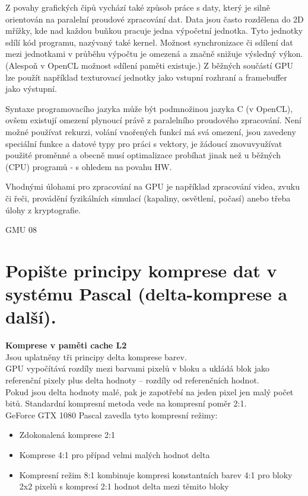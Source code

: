 	Z povahy grafických čipů vychází také způsob práce s daty, který je silně orientován na paralelní proudové zpracování dat. Data jsou často rozdělena do 2D mřížky, kde nad každou buňkou pracuje jedna výpočetní jednotka. Tyto jednotky sdílí kód programu, nazývaný také kernel. Možnost synchronizace či sdílení dat mezi jednotkami v průběhu výpočtu je omezená a značně snižuje výsledný výkon. (Alespoň v OpenCL možnost sdílení paměti existuje.) Z běžných součástí GPU lze použít například texturovací jednotky jako vstupní rozhraní a framebuffer jako výstupní.
	
	Syntaxe programovacího jazyka může být podmnožinou jazyka C (v OpenCL), ovšem existují omezení plynoucí právě z paralelního proudového zpracování. Není možné používat rekurzi, volání vnořených funkcí má svá omezení, jsou zavedeny speciální funkce a datové typy pro práci s vektory, je žádoucí znovuvyužívat použité proměnné a obecně musí optimalizace probíhat jinak než u běžných (CPU) programů - s ohledem na povahu HW.
	
	Vhodnými úlohami pro zpracování na GPU je například zpracování videa, zvuku či řeči, provádění fyzikálních simulací (kapaliny, osvětlení, počasí) anebo třeba úlohy z kryptografie.


	GMU 08
	
	
\section{Popište principy komprese dat v systému Pascal (delta-komprese a další).}
	\textbf{Komprese v paměti cache L2} \\
	Jsou uplatněny tři principy delta komprese barev. \\
	GPU vypočítává rozdíly mezi barvami pixelů v bloku a ukládá blok jako referenční pixely plus delta hodnoty -- rozdíly od referenčních hodnot. \\
	Pokud jsou delta hodnoty malé, pak je zapotřebí na jeden pixel jen malý	počet bitů. Standardní kompresní metoda vede na kompresní poměr 2:1. \\
	GeForce GTX 1080 Pascal zavedla tyto kompresní režimy:
	\begin{itemize}
		\setlength\itemsep{0em}
		\item Zdokonalená komprese 2:1
		\item Komprese 4:1 pro případ velmi malých hodnot delta
		\item Kompresní režim 8:1 kombinuje kompresi konstantních barev 4:1 pro bloky 2x2 pixelů s kompresí 2:1 hodnot delta mezi těmito bloky
	\end{itemize}	
	
